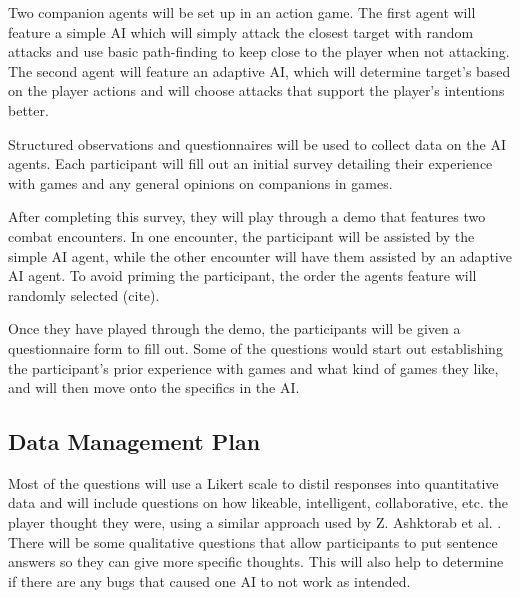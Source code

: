 \documentclass{IEEEtran}
\begin{document}

Two companion agents will be set up in an action game. The first agent will feature a simple AI which will simply attack the closest target with random attacks and use basic path-finding to keep close to the player when not attacking. The second agent will feature an adaptive AI, which will determine target's based on the player actions and will choose attacks that support the player's intentions better.

Structured observations and questionnaires will be used to collect data on the AI agents. Each participant will fill out an initial survey detailing their experience with games and any general opinions on companions in games.

After completing this survey, they will play through a demo that features two combat encounters. In one encounter, the participant will be assisted by the simple AI agent, while the other encounter will have them assisted by an adaptive AI agent. To avoid priming the participant, the order the agents feature will randomly selected (cite).


Once they have played through the demo, the participants will be given a questionnaire form to fill out. Some of the questions would start out establishing the participant's prior experience with games and what kind of games they like, and will then move onto the specifics in the AI.

\subsection{Data Management Plan}
\label{DataManagementPlan}

Most of the questions will use a Likert scale to distil responses into quantitative data and will include questions on how likeable, intelligent, collaborative, etc. the player thought they were, using a similar approach used by Z. Ashktorab et al. \cite{SocialPerceptions2020}. There will be some qualitative questions that allow participants to put sentence answers so they can give more specific thoughts. This will also help to determine if there are any bugs that caused one AI to not work as intended.
\end{document}
